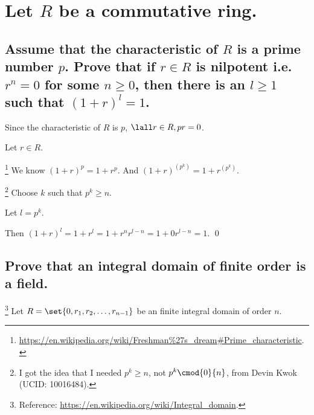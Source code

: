 \section[Problem 4]{Let $R$ be a commutative ring.}
    \subsection[(i)]{Assume that the characteristic of $R$ is a prime number $p$.
        Prove that if $r \in R$ is nilpotent i.e. $r^n = 0$ for some $n \geq 0$,
        then there is an $l \geq 1$ such that $(1 + r)^l= 1$.
    }
        Since the characteristic of $R$ is $p$,
        $\lall r \in R, p r = 0$.
        
        Let $r \in R$.

        \footnote{\url{https://en.wikipedia.org/wiki/Freshman\%27s_dream\#Prime_characteristic}.}
        We know $(1+r)^p = 1 + r^p$.
        And $(1+r)^{(p^k)} = 1+r^{(p^k)}$.

        \footnote{I got the idea that I needed $p^k \geq n$, not $p^k \cmod{0}{n}$,
            from Devin Kwok (UCID: 10016484).}
        Choose $k$ such that $p^k \geq n$.

        Let $l = p^k$.

        Then $(1+r)^l = 1 + r^l = 1 + r^nr^{l-n} = 1 + 0r^{l-n} = 1$.
        \qed







    \subsection[(ii)]{Prove that an integral domain of finite order is a field.}
        \footnote{Reference: \url{https://en.wikipedia.org/wiki/Integral_domain}.}
        Let $R = \set{0, r_1, r_2, \hdots, r_{n-1}}$ be an finite integral domain of order $n$.

